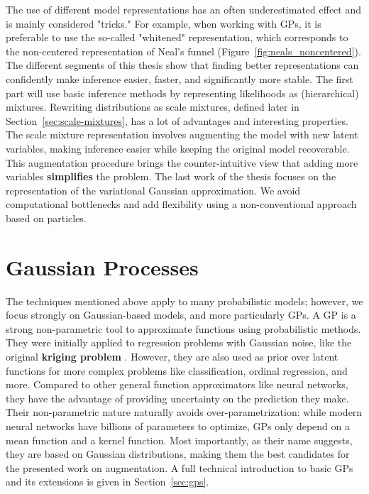 The use of different model representations has an often underestimated effect and is mainly considered "tricks."
For example, when working with \acf{GPs}, it is preferable to use the so-called "whitened" representation, which corresponds to the non-centered representation of Neal's funnel (Figure~\ref{fig:neals_noncentered}).
The different segments of this thesis show that finding better representations can confidently make inference easier, faster, and significantly more stable. 
The first part will use basic inference methods by representing likelihoods as (hierarchical) mixtures.
Rewriting distributions as scale mixtures, defined later in Section~\ref{sec:scale-mixtures}, has a lot of advantages and interesting properties.
The scale mixture representation involves augmenting the model with new latent variables, making inference easier while keeping the original model recoverable.
This augmentation procedure brings the counter-intuitive view that adding more variables \textbf{simplifies} the problem.
The last work of the thesis focuses on the representation of the variational Gaussian approximation.
We avoid computational bottlenecks and add flexibility using a non-conventional approach based on particles.

\section{Gaussian Processes}

The techniques mentioned above apply to many probabilistic models; however, we focus strongly on Gaussian-based models, and more particularly \acf{GPs}.
A \ac{GP} is a strong non-parametric tool to approximate functions using probabilistic methods.
They were initially applied to regression problems with Gaussian noise, like the original \textbf{kriging problem} \cite{cressie1990origins}.
However, they are also used as prior over latent functions for more complex problems like classification, ordinal regression, and more.
Compared to other general function approximators like neural networks, they have the advantage of providing uncertainty on the prediction they make.
Their non-parametric nature naturally avoids over-parametrization: while modern neural networks have billions of parameters to optimize, \ac{GPs} only depend on a mean function and a kernel function.
Most importantly, as their name suggests, they are based on Gaussian distributions, making them the best candidates for the presented work on augmentation.
A full technical introduction to basic \ac{GPs} and its extensions is given in Section~\ref{sec:gps}.


